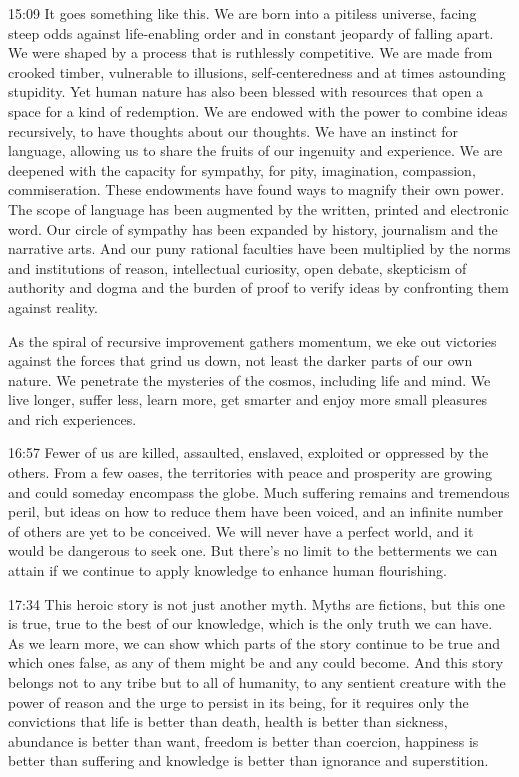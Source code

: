 \documentclass[10pt,titlepage]{article}
\begin{document}
15:09
It goes something like this.
We are born into a pitiless universe,
facing steep odds against life-enabling order
and in constant jeopardy of falling apart.
We were shaped by a process that is ruthlessly competitive.
We are made from crooked timber,
vulnerable to illusions, self-centeredness
and at times astounding stupidity.
Yet human nature has also been blessed with resources
that open a space for a kind of redemption.
We are endowed with the power to combine ideas recursively,
to have thoughts about our thoughts.
We have an instinct for language,
allowing us to share the fruits of our ingenuity and experience.
We are deepened with the capacity for sympathy,
for pity, imagination, compassion, commiseration.
These endowments have found ways to magnify their own power.
The scope of language has been augmented
by the written, printed and electronic word.
Our circle of sympathy has been expanded
by history, journalism and the narrative arts.
And our puny rational faculties have been multiplied
by the norms and institutions of reason,
intellectual curiosity, open debate,
skepticism of authority and dogma
and the burden of proof to verify ideas
by confronting them against reality.

As the spiral of recursive improvement
gathers momentum,
we eke out victories against the forces that grind us down,
not least the darker parts of our own nature.
We penetrate the mysteries of the cosmos, including life and mind.
We live longer, suffer less, learn more,
get smarter and enjoy more small pleasures
and rich experiences.

16:57
Fewer of us are killed, assaulted, enslaved, exploited
or oppressed by the others.
From a few oases, the territories with peace and prosperity are growing
and could someday encompass the globe.
Much suffering remains
and tremendous peril,
but ideas on how to reduce them have been voiced,
and an infinite number of others are yet to be conceived.
We will never have a perfect world,
and it would be dangerous to seek one.
But there's no limit to the betterments we can attain
if we continue to apply knowledge to enhance human flourishing.

17:34
This heroic story is not just another myth.
Myths are fictions, but this one is true,
true to the best of our knowledge, which is the only truth we can have.
As we learn more,
we can show which parts of the story continue to be true and which ones false,
as any of them might be and any could become.
And this story belongs not to any tribe
but to all of humanity,
to any sentient creature with the power of reason
and the urge to persist in its being,
for it requires only the convictions
that life is better than death,
health is better than sickness,
abundance is better than want,
freedom is better than coercion,
happiness is better than suffering
and knowledge is better than ignorance and superstition.
\end{document}
